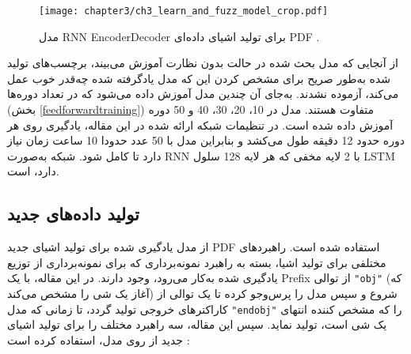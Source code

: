 \begin{figure}%
	\centering
	\texttt{[image: chapter3/ch3\_learn\_and\_fuzz\_model\_crop.pdf]}
	\caption[مدل \gls*{RNN} \gls*{EncoderDecoder} برای تولید اشیای داده‌ای \gls*{PDF}]
	{
		مدل \gls{RNN} \gls{EncoderDecoder} برای تولید اشیای داده‌ای \gls{PDF} \cite{Godefroid:2017:LML:3155562.3155573}.
	}
	\label{ch3_learn_and_fuzz_model_crop.pdf}
\end{figure}


از آنجایی که مدل بحث شده در حالت بدون نظارت آموزش می‌بیند، برچسب‌های تولید شده به‌طور صریح برای مشخص کردن این که مدل یادگرفته شده چه‌قدر خوب عمل می‌کند، آزموده نشدند. به‌جای آن چندین مدل آموزش داده می‌شود که در تعداد دوره‌ها (بخش \ref{feedforwardtraining}) متفاوت هستند. مدل در 10، 20، 30، 40 و 50 دوره آموزش داده شده است. در تنظیمات شبکه ارائه شده در این مقاله، یادگیری روی هر دوره حدود 12 دقیقه طول می‌کشد و بنابراین مدل با 50 عدد حدودا 10 ساعت زمان نیاز دارد تا کامل شود. شبکه به‌صورت \gls{RNN} با 2 لایه مخفی که هر لایه 128 سلول \gls{LSTM} دارد، است.


\subsection{تولید داده‌های جدید}\label{sec:new_data_generation}
از مدل یادگیری شده برای تولید اشیای جدید \gls{PDF} استفاده شده است. راهبردهای مختلفی برای تولید اشیا، بسته به راهبرد نمونه‌برداری که برای نمونه‌برداری از توزیع یادگیری شده به‌کار می‌رود، وجود دارند. در این مقاله، با یک \gls{Prefix} از توالی \texttt{"obj"} (که آغاز یک شی را مشخص می‌کند) شروع و سپس مدل را پرس‌وجو کرده تا یک توالی از کاراکترهای خروجی تولید گردد، تا زمانی که مدل \texttt{"endobj"} را که مشخص کننده انتهای یک شی است، تولید نماید. سپس این مقاله، سه راهبرد مختلف را برای تولید اشیای جدید از روی مدل، استفاده کرده است \cite{Godefroid:2017:LML:3155562.3155573}:

